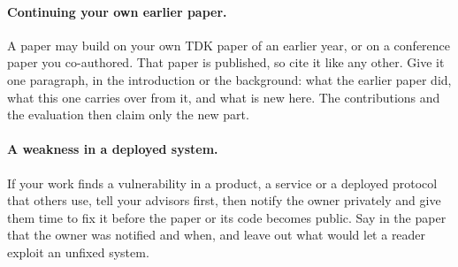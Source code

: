 \paragraph{Continuing your own earlier paper.} A paper may build on your own TDK paper of an earlier year, or on a conference paper you co-authored. That paper is published, so cite it like any other. Give it one paragraph, in the introduction or the background: what the earlier paper did, what this one carries over from it, and what is new here. The contributions and the evaluation then claim only the new part.

\paragraph{A weakness in a deployed system.} If your work finds a vulnerability in a product, a service or a deployed protocol that others use, tell your advisors first, then notify the owner privately and give them time to fix it before the paper or its code becomes public. Say in the paper that the owner was notified and when, and leave out what would let a reader exploit an unfixed system.

